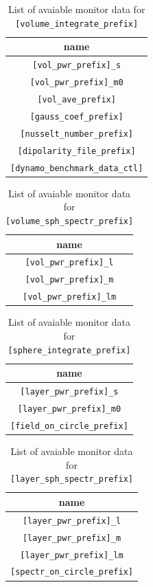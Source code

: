 %
\begin{table}[htp]
\caption{List of avaiable monitor data for {\tt [volume\_integrate\_prefix]}}
\begin{center} 
\begin{tabular}{|c|}
\hline
 name  \\ \hline \hline
\verb|[vol_pwr_prefix]_s|   \\
\verb|[vol_pwr_prefix]_m0|   \\
\verb|[vol_ave_prefix]|   \\
\verb|[gauss_coef_prefix]|     \\
\verb|[nusselt_number_prefix]|     \\
\verb|[dipolarity_file_prefix]|     \\
\verb|[dynamo_benchmark_data_ctl]|     \\ \hline
\end{tabular}
\end{center}
\label{table:volume_integrate_prefix}
\end{table}
%
\begin{table}[htp]
\caption{List of avaiable monitor data for {\tt [volume\_sph\_spectr\_prefix]}}
\begin{center} 
\begin{tabular}{|c|}
\hline
 name  \\ \hline \hline
\verb|[vol_pwr_prefix]_l|   \\
\verb|[vol_pwr_prefix]_m|   \\
\verb|[vol_pwr_prefix]_lm|    \\ \hline
\end{tabular}
\end{center}
\label{table:volume_sph_spectr_prefix}
\end{table}
%
\begin{table}[htp]
\caption{List of avaiable monitor data for {\tt [sphere\_integrate\_prefix]}}
\begin{center} 
\begin{tabular}{|c|}
\hline
 name  \\ \hline \hline
\verb|[layer_pwr_prefix]_s|   \\
\verb|[layer_pwr_prefix]_m0|   \\
\verb|[field_on_circle_prefix]|     \\ \hline
\end{tabular}
\end{center}
\label{table:sphere_integrate_prefix}
\end{table}
%
\begin{table}[htp]
\caption{List of avaiable monitor data for {\tt [layer\_sph\_spectr\_prefix]}}
\begin{center} 
\begin{tabular}{|c|}
\hline
 name  \\ \hline \hline
\verb|[layer_pwr_prefix]_l|   \\
\verb|[layer_pwr_prefix]_m|   \\
\verb|[layer_pwr_prefix]_lm|   \\
\verb|[spectr_on_circle_prefix]|     \\ \hline
\end{tabular}
\end{center}
\label{table:layer_sph_spectr_prefix}
\end{table}
